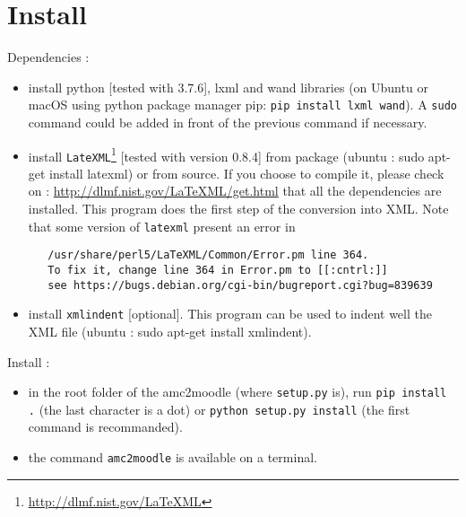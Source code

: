 \documentclass[a4paper]{article}
\newcommand{\amc}{\texttt{amc2moodle}}
\begin{document}
\section{Install}
Dependencies :
\begin{itemize}
	\item install python [tested with 3.7.6], lxml and wand libraries (on Ubuntu or macOS using python package manager pip: \texttt{pip install lxml wand}). A \texttt{sudo} command could be added in front of the previous command if necessary.
    \item install \texttt{LateXML}\footnote{\url{http://dlmf.nist.gov/LaTeXML}} [tested with version 0.8.4] from package (ubuntu : sudo apt-get install latexml) or from source. If you choose to compile it, please check on :   
     \url{http://dlmf.nist.gov/LaTeXML/get.html}  that all the dependencies are installed. This program does the first step of the conversion into XML. Note that some version of \texttt{latexml} present an error in  
\begin{verbatim}
   /usr/share/perl5/LaTeXML/Common/Error.pm line 364.  
   To fix it, change line 364 in Error.pm to [[:cntrl:]]
   see https://bugs.debian.org/cgi-bin/bugreport.cgi?bug=839639
     \end{verbatim}
    \item install \texttt{xmlindent} [optional]. This program can be used to indent well the XML file (ubuntu : sudo apt-get install xmlindent). %
\end{itemize}



Install :
\begin{itemize}
  \item in the root folder of the amc2moodle (where \texttt{setup.py} is), run \texttt{pip install .} (the last character is a dot) or \texttt{python setup.py install} (the first command is recommanded).
  \item the command \texttt{amc2moodle} is available on a terminal.
\end{itemize} 
\end{document}
